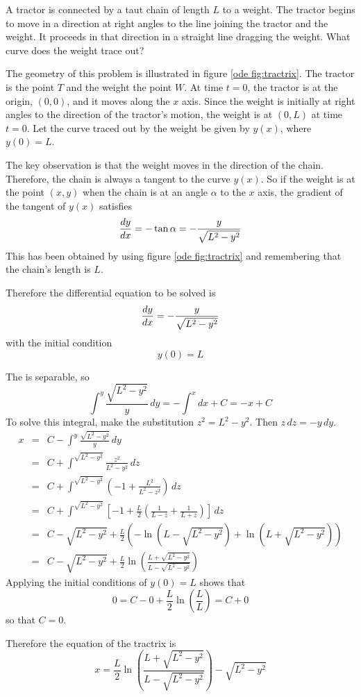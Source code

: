 \begin{example}
\label{ode exam:tractrix}

\problem
A tractor is connected by a taut chain of length $L$ to a weight.  The
tractor begins to move in a direction at right angles to the line joining
the tractor and the weight.  It proceeds in that direction in a straight
line dragging the weight.  What curve does the weight trace out?

\solution
The geometry of this problem is illustrated in figure \ref{ode
fig:tractrix}.  The tractor is the point $T$ and the weight the point $W$.
At time $t=0$, the tractor is at the origin, $(0,0)$, and it moves along the 
$x$ axis.  Since the weight is initially at right angles to the direction of
the tractor's motion, the weight is at $(0,L)$ at time $t=0$. Let the curve 
traced out by the weight be given by $y(x)$, where $y(0)=L$.

The key observation is that the weight moves in the direction of the chain.
Therefore, the chain is always a tangent to the curve $y(x)$.  So if the
weight is at the point $(x,y)$ when the chain is at an angle $\alpha$ to
the $x$ axis, the gradient of the tangent of $y(x)$ satisfies
$$\frac{dy}{dx}=-\tan\alpha=-\frac{y}{\sqrt{L^2-y^2}}$$
This has been obtained by using figure \ref{ode fig:tractrix} and
remembering that the chain's length is $L$.


Therefore the differential equation to be solved is
$$\frac{dy}{dx}=-\frac{y}{\sqrt{L^2-y^2}}$$
with the initial condition
$$y(0)=L$$

The \ODE is separable, so
$$\int^y\frac{\sqrt{L^2-y^2}}{y}\,dy =-\int^x dx+C=-x+C$$
To solve this integral, make the substitution $z^2=L^2-y^2$.  Then
$z\,dz=-y\,dy$.
\begin{eqnarray*}
x&=&C-\int^y\frac{\sqrt{L^2-y^2}}{y}\,dy \\
&=&C+\int^{\sqrt{L^2-y^2}}\frac{z^2}{L^2-y^2}\,dz \\
&=&C+\int^{\sqrt{L^2-y^2}} \left(-1 +\frac{L^2}{L^2-z^2}\right)\,dz \\
&=&C+\int^{\sqrt{L^2-y^2}}\left[ 
-1 +\frac{L}{2}\left(\frac{1}{L-z}+\frac{1}{L+z}\right)\right]\,dz \\
&=&C-\sqrt{L^2-y^2}+\frac{L}{2}\left(-\ln\left(L-\sqrt{L^2-y^2}\right)
+\ln\left(L+\sqrt{L^2-y^2}\right)\right) \\
&=&C-\sqrt{L^2-y^2}+\frac{L}{2}\ln\left(\frac{L+\sqrt{L^2-y^2}}
{L-\sqrt{L^2-y^2}}\right)
\end{eqnarray*}
Applying the initial conditions of $y(0)=L$ shows that
$$0=C-0+\frac{L}{2}\ln\left(\frac{L}{L}\right)=C+0$$
so that $C=0$.

Therefore the equation of the tractrix is
$$x=\frac{L}{2}\ln\left(\frac{L+\sqrt{L^2-y^2}}{L-\sqrt{L^2-y^2}}\right)
-\sqrt{L^2-y^2}$$
\end{example}

